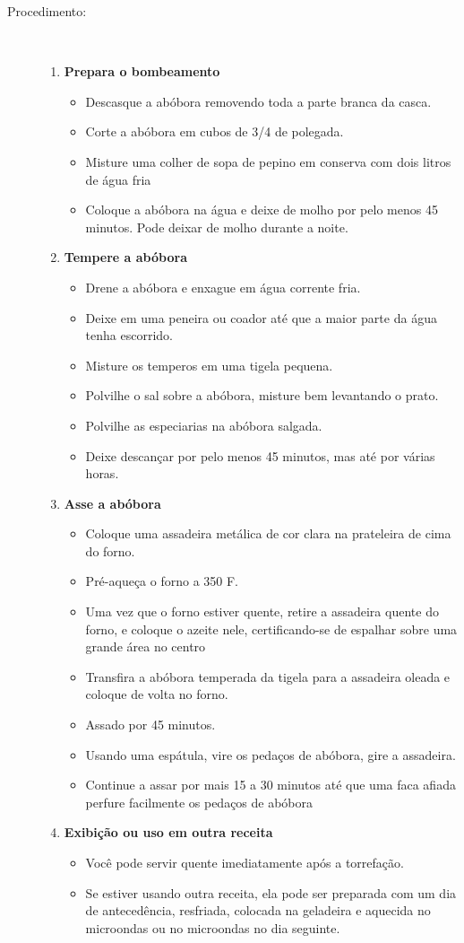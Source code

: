 \documentclass [11pt, papel de carta] {article}
\begin{document}
\begin {description}
\item [Procedimento:] \ \\
\begin {enumerate}
\item {\bf Prepara o bombeamento}
\begin {itemize}
\item Descasque a abóbora removendo toda a parte branca da casca.
\item Corte a abóbora em cubos de 3/4 de polegada.
\item Misture uma colher de sopa de pepino em conserva com dois litros de água fria
\item Coloque a abóbora na água e deixe de molho por pelo menos 45 minutos. Pode deixar de molho durante a noite.
\end {itemize}
\item {\bf Tempere a abóbora}
\begin {itemize}
\item Drene a abóbora e enxague em água corrente fria.
\item Deixe em uma peneira ou coador até que a maior parte da água tenha escorrido.
\item Misture os temperos em uma tigela pequena.
\item Polvilhe o sal sobre a abóbora, misture bem levantando o prato.
\item Polvilhe as especiarias na abóbora salgada.
\item Deixe descançar  por pelo menos 45 minutos, mas até por várias horas.
\end {itemize}
\item {\bf Asse a abóbora}
\begin {itemize}
\item Coloque uma assadeira metálica de cor clara na prateleira de cima do forno.
\item Pré-aqueça o forno a 350 F.
\item Uma vez que o forno estiver quente, retire a assadeira quente do forno, e coloque o azeite nele, certificando-se de espalhar sobre uma grande área no centro
\item Transfira a abóbora temperada da tigela para a assadeira oleada e coloque de volta no forno.
\item Assado por 45 minutos.
\item Usando uma espátula, vire os pedaços de abóbora, gire a assadeira.
\item Continue a assar por mais 15 a 30 minutos até que uma faca afiada perfure facilmente os pedaços de abóbora
\end {itemize}
\item {\bf Exibição ou uso em outra receita}
\begin {itemize}
\item Você pode servir quente imediatamente após a torrefação.
\item Se estiver usando outra receita, ela pode ser preparada com um dia de antecedência, resfriada, colocada na geladeira e aquecida no microondas ou no microondas no dia seguinte.
\end {itemize}
\end {enumerate}
\end {description}
\end{document}
